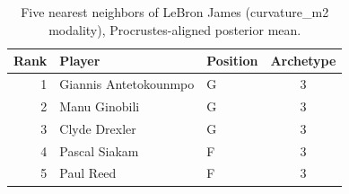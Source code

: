 \begin{table}[htbp]
  \centering\small
  \begin{tabular}{rllc}
    \toprule
    Rank & Player & Position & Archetype \\
    \midrule
    1 & Giannis Antetokounmpo & G & 3 \\
    2 & Manu Ginobili & G & 3 \\
    3 & Clyde Drexler & G & 3 \\
    4 & Pascal Siakam & F & 3 \\
    5 & Paul Reed & F & 3 \\
    \bottomrule
  \end{tabular}
  \caption{Five nearest neighbors of LeBron James (curvature_m2 modality), Procrustes-aligned posterior mean.}
  \label{tab:LeBron_James_neighbors_curvature_m2}
\end{table}

